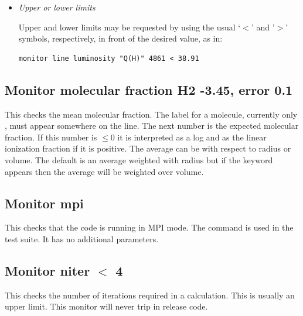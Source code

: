 \begin{itemize}
In the absence of any of these keywords, the monitored intensity is
interpreted as .
If only the keyword  appears, the intensity is
interpreted as .
Checks against the (instantaneous, non-integrated) emergent intensity
are issued with the  keyword, while checks against
the time-integrated emergent intensity are issued with the
 keywords.

\item \emph{Upper or lower limits}

Upper and lower limits may be requested by using the usual `$<$' and '$>$'
symbols, respectively, in front of the desired value, as in:
%
\begin{verbatim}
monitor line luminosity "Q(H)" 4861 < 38.91
\end{verbatim}

\end{itemize}

\subsection{Monitor molecular fraction H2 -3.45, error 0.1}

This checks the mean molecular fraction.
The label for a molecule,
currently only \htwo, must appear somewhere on the line.
The next number is
the expected molecular fraction.
If this number is $\le 0$ it is interpreted
as a log and as the linear ionization fraction if it is positive.
The
average can be with respect to radius or volume.
The default is an average
weighted with radius but if the keyword  appears then the average
will be weighted over volume.

\subsection{Monitor mpi}

This checks that the code is running in MPI mode. The command is used
in the  test suite. It has no additional parameters.

\subsection{Monitor niter $<$ 4}

This checks the number of iterations required in a calculation.
This is usually an upper limit.
This monitor will never trip in release code.

